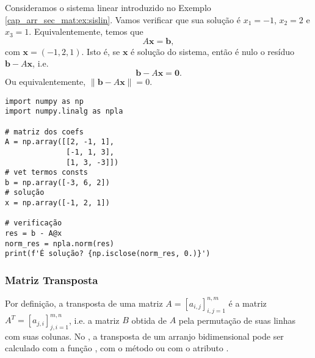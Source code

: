 \begin{ex}
  Consideramos o sistema linear introduzido no Exemplo \ref{cap_arr_sec_mat:ex:sislin}. Vamos verificar que sua solução é $x_1 = -1$, $x_2 = 2$ e $x_3 = 1$. Equivalentemente, temos que
  \begin{equation}
    A\pmb{x} = \pmb{b},
  \end{equation}
  com $\pmb{x} = (-1, 2, 1)$. Isto é, se $\pmb{x}$ é solução do sistema, então é nulo o resíduo $\pmb{b} - A\pmb{x}$, i.e.
  \begin{equation}
    \pmb{b} - A\pmb{x} = \pmb{0}.
  \end{equation}
  Ou equivalentemente, $\|\pmb{b} - A\pmb{x}\| = 0$.

\begin{lstlisting}
import numpy as np
import numpy.linalg as npla

# matriz dos coefs
A = np.array([[2, -1, 1],
              [-1, 1, 3],
              [1, 3, -3]])
# vet termos consts
b = np.array([-3, 6, 2])
# solução
x = np.array([-1, 2, 1])

# verificação
res = b - A@x
norm_res = npla.norm(res)
print(f'É solução? {np.isclose(norm_res, 0.)}')
\end{lstlisting}

\end{ex}

\subsubsection{Matriz Transposta}

Por definição, a transposta de uma matriz $A = [a_{i,j}]_{i,j=1}^{n,m}$ é a matriz $A^T = [a_{j,i}]_{j,i=1}^{m,n}$, i.e. a matriz $B$ obtida de $A$ pela permutação de suas linhas com suas colunas. No {\numpy}, a transposta de um arranjo bidimensional pode ser calculado com a função {\PYTHONnumpyDOTtranspose}, com o método {\PYTHONnumpyDOTndarrayDOTtranspose} ou com o atributo {\PYTHONnumpyDOTndarrayDOTT}.

